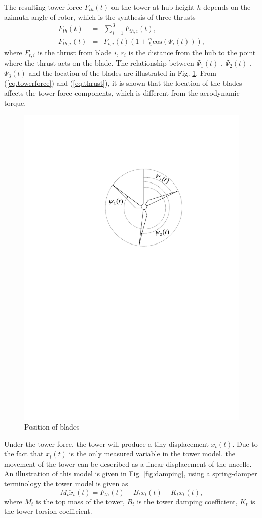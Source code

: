 The resulting tower force  $F_{th}(t)$ on the tower at hub
height $h$ depends on the azimuth angle of rotor, which
is the synthesis of three thrusts \cite{ref:8}
\begin{eqnarray}
  F_{th}(t) &=& \sum^{3}_{i=1}F_{th,i}(t) \label{eq.towerforce}, \\
  F_{th,i}(t) &=& F_{t,i}(t)(1+\frac{r_t}{h}\mathrm{cos}(\Psi_i(t))) \label{eq.thrust},
\end{eqnarray}
where $F_{t,i}$ is the thrust from blade $i$, $r_i$ is the
 distance from the hub to the point where the thrust acts on the blade.
 The relationship between $\Psi_1(t)$ , $\Psi_2(t)$ , $\Psi_3(t)$
  and the location of the blades are illustrated in Fig. \ref{fig:position}.
From (\ref{eq.towerforce}) and (\ref{eq.thrust}), it is shown that the location of the blades affects the tower
  force components, which is  different from the aerodynamic torque.

\begin{figure}[!htb]
  \centering
  \includegraphics[width=0.5\hsize]{Visio-bladelocation.pdf}
  \caption{Position of blades}
  \label{fig:position}
\end{figure}

Under the tower force, the tower will produce a tiny
displacement  $x_t(t)$. Due to the fact that $x_t(t)$ is the only measured variable in the tower
 model, the movement of the tower can be described as a linear
 displacement of the nacelle. An illustration of this model is given in Fig. \ref{fig:damping},
using a spring-damper terminology the tower model is
 given as
\begin{equation} \label{eq.tower}
  M_t\ddot{x}_t(t) = F_{th}(t) - B_t\dot{x}_t(t) - K_tx_t(t),
\end{equation}
where $M_t$ is the top mass of the tower, $B_t$  is the
tower damping coefficient, $K_t$  is the tower torsion coefficient.

